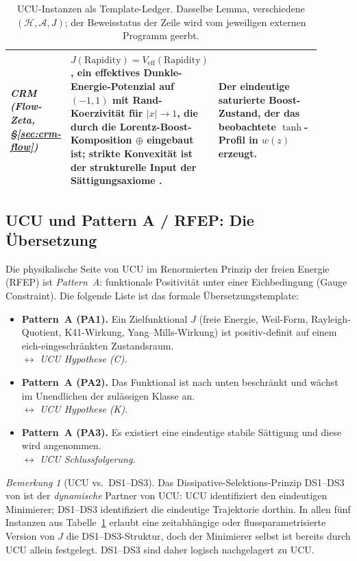 \documentclass[11pt]{article}
\theoremstyle{definition}
\theoremstyle{remark}
\newtheorem{remark}[theorem]{Bemerkung}
\begin{document}
\begin{table}[htbp]
\begin{tabular}{|p{0.16\linewidth}|p{0.40\linewidth}|p{0.34\linewidth}|}
\emph{CRM (Flow-Zeta, \S\ref{sec:crm-flow})}
& $J(\mathrm{Rapidity}) = V_{\mathrm{eff}}(\mathrm{Rapidity})$, ein
effektives Dunkle-Energie-Potenzial auf $(-1,1)$ mit Rand-Koerzivität für $|x| \to 1$,
die durch die Lorentz-Boost-Komposition $\oplus$ eingebaut ist; strikte Konvexität
ist der strukturelle Input der Sättigungsaxiome \cite{CRMV}.
& Der eindeutige saturierte Boost-Zustand, der das beobachtete $\tanh$-Profil in
$w(z)$ erzeugt. \\ \hline

\end{tabular}
\caption{UCU-Instanzen als Template-Ledger. Dasselbe Lemma, verschiedene
$(\mathcal{H},\mathcal{A},J)$; der Beweisstatus der Zeile wird vom jeweiligen
externen Programm geerbt.}
\label{tab:ucu-instances}
\end{table}
\renewcommand{\arraystretch}{1.0}

\subsection{UCU und Pattern A / RFEP: Die Übersetzung}
\label{sec:ucu-pattern-a}

Die physikalische Seite von UCU im Renormierten Prinzip der freien Energie (RFEP)
\cite{RFEPFramework} ist \emph{Pattern~A}: funktionale Positivität unter einer
Eichbedingung (Gauge Constraint). Die folgende Liste ist das formale
Übersetzungstemplate:

\begin{itemize}
\item \textbf{Pattern~A (PA1).} Ein Zielfunktional $J$ (freie Energie,
Weil-Form, Rayleigh-Quotient, K41-Wirkung, Yang--Mills-Wirkung) ist
positiv-definit auf einem eich-eingeschränkten Zustandsraum.\\
$\longleftrightarrow$ \emph{UCU Hypothese (C).}

\item \textbf{Pattern~A (PA2).} Das Funktional ist nach unten beschränkt
und wächst im Unendlichen der zulässigen Klasse an.\\
$\longleftrightarrow$ \emph{UCU Hypothese (K).}

\item \textbf{Pattern~A (PA3).} Es existiert eine eindeutige stabile Sättigung
und diese wird angenommen.\\
$\longleftrightarrow$ \emph{UCU Schlussfolgerung.}
\end{itemize}

\begin{remark}[UCU vs.\ DS1--DS3]\label{rem:ucu-vs-ds}
Das Dissipative-Selektions-Prinzip DS1--DS3 von
\cite{RFEPFramework} ist der \emph{dynamische} Partner von UCU: UCU
identifiziert den eindeutigen Minimierer; DS1--DS3 identifiziert die eindeutige
Trajektorie dorthin. In allen fünf Instanzen aus
Tabelle~\ref{tab:ucu-instances} erlaubt eine zeitabhängige oder flussparametrisierte
Version von $J$ die DS1--DS3-Struktur, doch der Minimierer
selbst ist bereits durch UCU allein festgelegt. DS1--DS3 sind daher
logisch nachgelagert zu UCU.
\end{remark}
\end{document}
